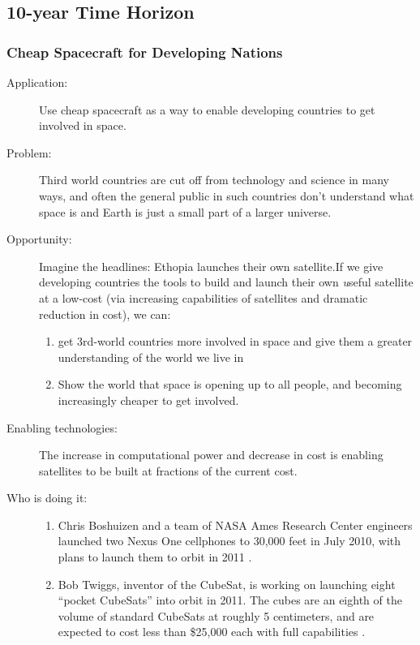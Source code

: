 \subsection{10-year Time Horizon}


\subsubsection{Cheap Spacecraft for Developing Nations}

\begin{description}
\item[Application:] Use cheap spacecraft as a way to enable developing countries to get involved in space.

\item[Problem:] Third world countries are cut off from technology and science in many ways, and often the general public in such countries don't understand what space is and Earth is just a small part of a larger universe.

\item[Opportunity:]
Imagine the headlines: Ethopia launches their own satellite.If we give developing countries the tools to build and launch their own {\emph useful} satellite at a low-cost (via increasing capabilities of satellites and dramatic reduction in cost), we can:
\begin{enumerate}
\item get 3rd-world countries more involved in space and give them a greater understanding of the world we live in
\item Show the world that space is opening up to all people, and becoming increasingly cheaper to get involved.
\end{enumerate}

\item[Enabling technologies:]
The increase in computational power and decrease in cost is enabling satellites to be built at fractions of the current cost.

\item[Who is doing it:]
\hfill\begin{enumerate}
\item Chris Boshuizen and a team of NASA Ames Research Center engineers launched two Nexus One cellphones to 30,000 feet in July 2010, with plans to launch them to orbit in 2011 \cite{McNally2010}.
\item Bob Twiggs, inventor of the CubeSat, is working on launching eight ``pocket CubeSats'' into orbit in 2011. The cubes are an eighth of the volume of standard CubeSats at roughly 5 centimeters, and are expected to cost less than \$25,000 each with full capabilities \cite{Patel2010}.
\end{enumerate}


\end{description}
